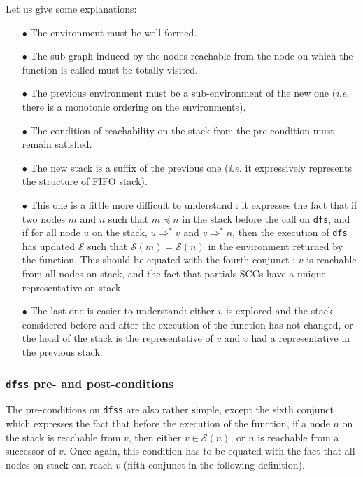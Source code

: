\documentclass[a4 paper, 12pt]{article}
\theoremstyle{definition}
\begin{document}
{\BlankLine
\BlankLine
\BlankLine

Let us give some explanations:
\begin{itemize}
    \item[$\bullet$] The environment must be well-formed.
    \item[$\bullet$] The sub-graph induced by the nodes reachable from the node on which the function is called must be totally visited.
    \item[$\bullet$] The previous environment must be a sub-environment of the new one (\textit{i.e.} there is a monotonic ordering on the environments).
    \item[$\bullet$] The condition of reachability on the stack from the pre-condition must remain satisfied.
    \item[$\bullet$] The new stack is a suffix of the previous one (\textit{i.e.} it expressively represents the structure of FIFO stack).
    \item[$\bullet$] This one is a little more difficult to understand : it expresses the fact that if two nodes $m$ and $n$ such that $m \preceq n$ in the stack before the call on \texttt{dfs}, and if for all node $u$ on the stack, $u \Rightarrow^* v$ and $v \Rightarrow^* n$, then the execution of \texttt{dfs} has updated $\mathcal{S}$ such that $\mathcal{S}(m) = \mathcal{S}(n)$ in the environment returned by the function. This should be equated with the fourth conjunct : $v$ is reachable from all nodes on stack, and the fact that partials SCCs have a unique representative on stack.
    \item[$\bullet$] The last one is easier to understand: either $v$ is explored and the stack considered before and after the execution of the function has not changed, or the head of the stack is the representative of $v$ and $v$ had a representative in the previous stack.
\end{itemize}

\subsubsection{\texttt{dfss} pre- and post-conditions}
The pre-conditions on \texttt{dfss} are also rather simple, except the sixth conjunct which expresses the fact that before the execution of the function, if a node $n$ on the stack is reachable from $v$, then either $v \in \mathcal{S}(n)$, or $n$ is reachable from a successor of $v$. Once again, this condition has to be equated with the fact that all nodes on stack can reach $v$ (fifth conjunct in the following definition).

}
\end{document}
